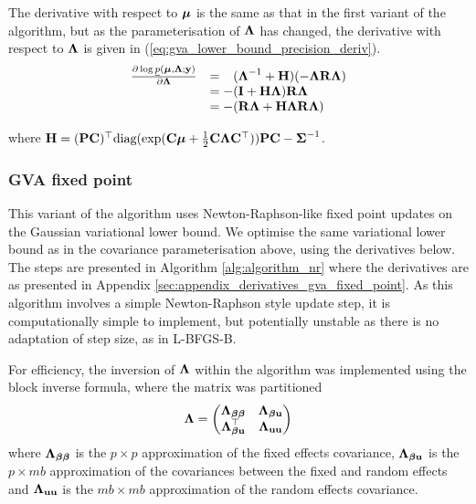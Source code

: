 \noindent The derivative with respect to ${\boldsymbol \mu}$ is the same as that in the first variant of the algorithm, but 
as the parameterisation of ${\boldsymbol \Lambda}$ has changed, the  derivative with respect to ${\boldsymbol \Lambda}$ is given in
(\ref{eq:gva_lower_bound_precision_deriv}).
\begin{equation}
\label{eq:gva_lower_bound_precision_deriv}
\begin{array}{ll}
	\frac{\partial \log \underline{p}({\boldsymbol \mu}, {\boldsymbol \Lambda}; {\bf y})}{\partial {\boldsymbol\Lambda}}
	  & = \hphantom{-}({\boldsymbol \Lambda}^{-1} + {\bf H})(-{\boldsymbol \Lambda} {\bf R} {\boldsymbol \Lambda}) \\
	  & = -({\bf I} + {\bf H}{\boldsymbol \Lambda}){\bf R}{\boldsymbol \Lambda}                           \\
	  & = - ({\bf R}{\boldsymbol \Lambda} + {\bf H}{\boldsymbol \Lambda}{\bf R}{\boldsymbol \Lambda})                  
\end{array}
\end{equation}
		
\noindent where ${\bf H} = ({\bf P} {\bf C})^\top \text{diag}(\exp({\bf C} {\boldsymbol \mu} + \frac{1}{2} {\bf C} {\boldsymbol \Lambda} {\bf C}^\top)) {\bf P} {\bf C} - {\boldsymbol \Sigma}^{-1}$.
		
\subsubsection{GVA fixed point} 	%
This variant of the algorithm uses Newton-Raphson-like fixed point updates on the Gaussian variational lower
bound. We optimise the same variational lower bound as in the covariance parameterisation above, using the
derivatives below. The steps are presented in Algorithm \ref{alg:algorithm_nr} where   the derivatives are as
presented in Appendix \ref{sec:appendix_derivatives_gva_fixed_point}. As this algorithm involves a simple
Newton-Raphson style update step, it is computationally simple to implement, but potentially unstable as there
is no adaptation of step size, as in L-BFGS-B.

For efficiency, the inversion of ${\boldsymbol \Lambda}$ within the algorithm was implemented using the block inverse 
formula, where	the matrix was partitioned
\[
	{\boldsymbol \Lambda} =
	\begin{pmatrix}
		{\boldsymbol\Lambda}_{{\boldsymbol \beta} {\boldsymbol \beta}} & {\boldsymbol \Lambda}_{{\boldsymbol \beta} {\bf u}} \\
		{\boldsymbol \Lambda}_{{\boldsymbol \beta} {\bf u}}^\top & {\boldsymbol \Lambda}_{{\bf u} {\bf u}}
	\end{pmatrix}
\]
where ${\boldsymbol \Lambda}_{{\boldsymbol \beta} {\boldsymbol \beta}}$ is the $p \times p$ approximation of the fixed effects covariance, ${\boldsymbol \Lambda}_{{\boldsymbol \beta} {\bf u}}$ is the $p \times mb$
approximation of the covariances between the fixed and random effects and ${\boldsymbol \Lambda}_{{\bf u} {\bf u}}$ is the $mb \times mb$
approximation of the random effects covariance.

